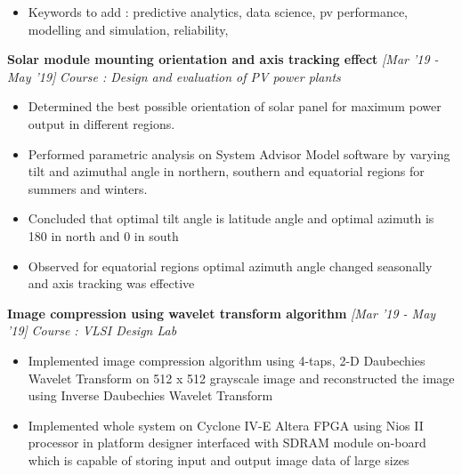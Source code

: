 \documentclass[10 pt]{article}%
\begin{document}
{{\begin{itemize}[leftmargin=*]
	\item Keywords to add : predictive analytics, data science, pv performance, modelling and simulation, reliability,
\end{itemize}
{\flushleft \textbf {\large{Solar module mounting orientation and axis tracking effect}} \hfill {{{\em{[Mar '19 - May '19]}}}}
\vspace{-0.8em}
{\flushleft \em{Course : Design and evaluation of PV power plants}}
\vspace{-5pt}
\begin{itemize}[leftmargin=*]
	\setlength\itemsep{1.5pt}
	\setlength\parskip{1.5pt}
  \item Determined the best possible orientation of solar panel for maximum power output in different regions.
\item Performed parametric analysis on System Advisor Model software by varying tilt and azimuthal angle in northern, southern and equatorial regions for summers and winters.
\item Concluded that optimal tilt angle is latitude angle and optimal azimuth is 180 in north and 0 in south
\item Observed for equatorial regions optimal azimuth angle changed seasonally and axis tracking was effective
\end{itemize}
{\flushleft \textbf {\large{Image compression using wavelet transform algorithm}} \hfill {{{\em{[Mar '19 - May '19]}}}}
	\vspace{-0.8em}
	{\flushleft \em{Course : VLSI Design Lab}}
	\vspace{-5pt}
	\begin{itemize}[leftmargin=*]
		\setlength\itemsep{1.5pt}
		\setlength\parskip{1.5pt}
\item Implemented image compression algorithm using 4-taps, 2-D Daubechies Wavelet Transform on 512 x 512 grayscale image and reconstructed the image using Inverse Daubechies Wavelet Transform
\item Implemented whole system on Cyclone IV-E Altera FPGA using Nios II processor in platform designer interfaced with SDRAM module on-board which is capable of storing input and output image data of large sizes

\end{itemize}}}}}
\end{document}
